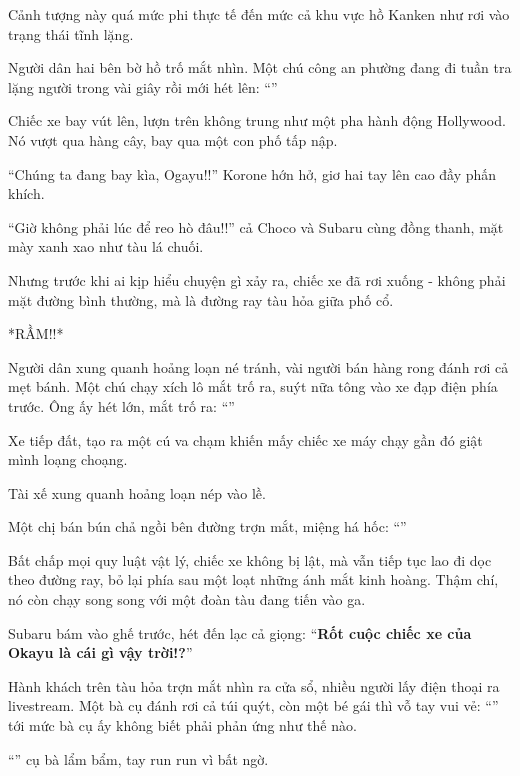 \documentclass[../main.tex]{subfiles}
\begin{document}
Cảnh tượng này quá mức phi thực tế đến mức cả khu vực hồ Kanken như rơi vào trạng thái tĩnh lặng.

Người dân hai bên bờ hồ trố mắt nhìn. Một chú công an phường đang đi tuần tra lặng người trong vài giây rồi mới hét lên: ``''

Chiếc xe bay vút lên, lượn trên không trung như một pha hành động Hollywood. Nó vượt qua hàng cây, bay qua một con phố tấp nập.

``Chúng ta đang bay kìa, Ogayu!!'' Korone hớn hở, giơ hai tay lên cao đầy phấn khích.

``Giờ không phải lúc để reo hò đâu!!'' cả Choco và Subaru cùng đồng thanh, mặt mày xanh xao như tàu lá chuối.

Nhưng trước khi ai kịp hiểu chuyện gì xảy ra, chiếc xe đã rơi xuống - không phải mặt đường bình thường, mà là đường ray tàu hỏa giữa phố cổ.

*RẦM!!*

Người dân xung quanh hoảng loạn né tránh, vài người bán hàng rong đánh rơi cả mẹt bánh. Một chú chạy xích lô mắt trố ra, suýt nữa tông vào xe đạp điện phía trước. Ông ấy hét lớn, mắt trố ra: ``\textbf{}''

Xe tiếp đất, tạo ra một cú va chạm khiến mấy chiếc xe máy chạy gần đó giật mình loạng choạng.

Tài xế xung quanh hoảng loạn nép vào lề.

Một chị bán bún chả ngồi bên đường trợn mắt, miệng há hốc: ``''

Bất chấp mọi quy luật vật lý, chiếc xe không bị lật, mà vẫn tiếp tục lao đi dọc theo đường ray, bỏ lại phía sau một loạt những ánh mắt kinh hoàng. Thậm chí, nó còn chạy song song với một đoàn tàu đang tiến vào ga.

Subaru bám vào ghế trước, hét đến lạc cả giọng: ``\textbf{Rốt cuộc chiếc xe của Okayu là cái gì vậy trời!?}''

Hành khách trên tàu hỏa trợn mắt nhìn ra cửa sổ, nhiều người lấy điện thoại ra livestream. Một bà cụ đánh rơi cả túi quýt, còn một bé gái thì vỗ tay vui vẻ: ``'' tới mức bà cụ ấy không biết phải phản ứng như thế nào.

``'' cụ bà lẩm bẩm, tay run run vì bất ngờ.
\end{document}
